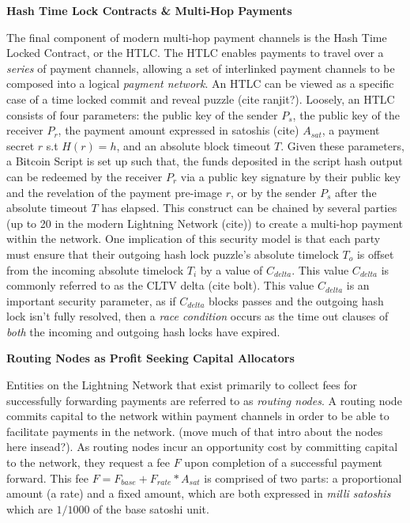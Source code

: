 \documentclass[10pt,a4paper]{article}
\theoremstyle{definition}
\begin{document}
\begin{center}
\textbf{Hash Time Lock Contracts \& Multi-Hop Payments}
\end{center}


The final component of modern multi-hop payment channels is the Hash Time Locked
Contract, or the HTLC. The HTLC enables payments to travel over a \emph{series}
of payment channels, allowing a set of interlinked payment channels to be
composed into a logical \emph{payment network}. An HTLC can be viewed as a
specific case of a time locked commit and reveal puzzle (cite ranjit?).
Loosely, an HTLC consists of four parameters: the public key of the sender
$P_{s}$, the public key of the receiver $P_{r}$, the payment amount expressed
in satoshis (cite) $A_{sat}$, a payment secret $r$ s.t $H(r) = h$, and an
absolute block timeout $T$. Given these parameters, a Bitcoin Script is set up
such that, the funds deposited in the script hash output can be redeemed by the
receiver $P_{r}$ via a public key signature by their public key and the revelation
of the payment pre-image $r$, or by the sender $P_{s}$ after the absolute
timeout $T$ has elapsed. This construct can be chained by several parties (up
to 20 in the modern Lightning Network (cite)) to create a multi-hop payment
within the network. One implication of this security model is that each party must ensure that their
outgoing hash lock puzzle's absolute timelock $T_o$ is offset from the incoming
absolute timelock $T_i$ by a value of $C_{delta}$. This value $C_{delta}$ is
commonly referred to as the CLTV delta (cite bolt). This value $C_{delta}$ is
an important security parameter, as if $C_{delta}$ blocks passes and the
outgoing hash lock isn't fully resolved, then a \emph{race condition} occurs as
the time out clauses of \emph{both} the incoming and outgoing hash locks have
expired. \\

\begin{center}
\textbf{Routing Nodes as Profit Seeking Capital Allocators}
\end{center}

Entities on the Lightning Network that exist primarily to collect fees
for successfully forwarding payments are
referred to as \emph{routing nodes}. A routing node commits capital to the
network within payment channels in order to be able to facilitate
payments in the network. (move much of that intro about the nodes here
insead?). As routing nodes incur an opportunity cost by committing capital
to the network, they request a fee $F$ upon
completion of a successful payment forward. This fee $F = F_{base} +
F_{rate}*A_{sat}$ is comprised of two parts: a proportional amount (a rate) and
a fixed amount, which are both expressed in \emph{milli satoshis} which are
$1/1000$ of the base satoshi unit.
\end{document}
